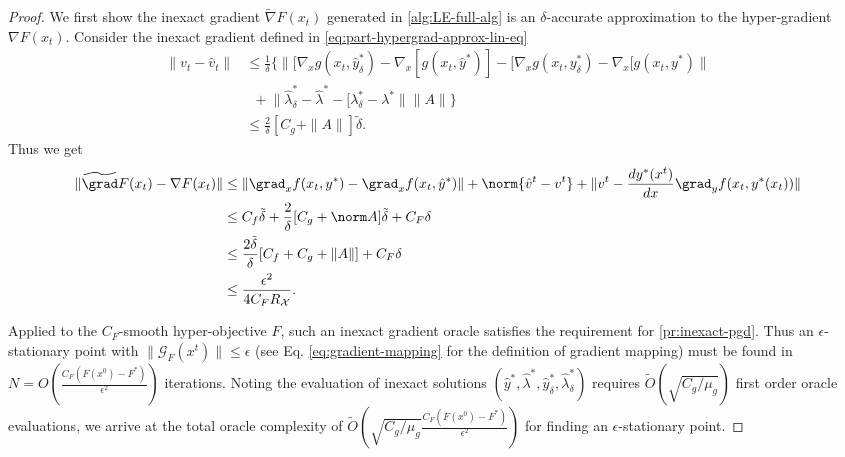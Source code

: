 \linEqFullCost*
\begin{proof}

We first show the inexact gradient $\widetilde{\nabla}F(x_t)$ generated in \cref{alg:LE-full-alg} is an $\delta$-accurate approximation to the hyper-gradient $\nabla F(x_t).$ Consider the inexact gradient defined in \eqref{eq:part-hypergrad-approx-lin-eq}
\begin{align*}
    \|v_{t}-\hat{v}_{t}\|&\leq\frac{1}{\delta}\{\|[\nabla_{x}g(x_{t},\hat{y}_{\delta}^{*})-\nabla_{x}[g(x_{t},\hat{y}^{*})]-[\nabla_{x}g(x_{t},y_{\delta}^{*})-\nabla_{x}[g(x_{t},y^{*})\|\\&\,\,\,+\ensuremath{\|\hat{\lambda}_{\delta}^{*}-\hat{\lambda}^{*}-[\lambda_{\delta}^{*}-\lambda^{*}\|\|A\|\}}\\&\leq\frac{2}{\delta}[C_{g}+\| A\|]\tilde{\delta}.
\end{align*}
Thus we get 
\begin{align*}
    \|\widetilde{\grad}F(x_{t})-\nabla F(x_{t})\|&\leq\|\grad_{x}f(x_{t},y^{*})-\grad_{x}f(x_{t},\hat{y}^{*})\|+\norm{\hat{v}^{t}-v^{t}}+\|v^{t}-\frac{dy^{*}(x^{t})}{dx}\grad_{y}f(x_{t},y^{*}(x_{t}))\|\\&\leq C_{f}\tilde{\delta}+\frac{2}{\delta}[C_{g}+\norm A]\tilde{\delta}+C_{F}\delta\\&\leq\frac{2\tilde{\delta}}{\delta}[C_{f}+C_{g}+\|A\|]+C_{F}\delta\\&\leq\frac{\epsilon^{2}}{4C_{F}R_{\mathcal{X}}}.
\end{align*}

Applied to the $C_F$-smooth hyper-objective $F$, such an inexact gradient oracle satisfies the requirement for  \cref{pr:inexact-pgd}. Thus an $\epsilon$-stationary point with $\|\mathcal{G}_F(x^t)\|\leq \epsilon$ (see Eq. \eqref{eq:gradient-mapping}  for the definition of gradient mapping) must be found in  $N=O(\frac{C_F (F(x^0)-F^*)}{\epsilon^2})$ iterations. Noting the evaluation of inexact solutions $(\hat y^*, \hat \lambda^*, \hat y_\delta^*, \hat \lambda_\delta^* )$ requires $\tilde{O}(\sqrt{C_g/\mu_g})$ first order oracle evaluations, we arrive at the total oracle complexity of $\tilde{O}(\sqrt{C_g/\mu_g}\frac{C_F (F(x^0)-F^*)}{\epsilon^2})$ for finding an $\epsilon$-stationary point. 


\end{proof}
